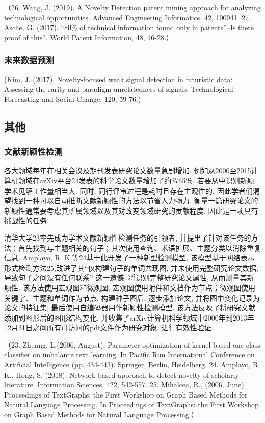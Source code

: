 \documentclass{Style/aas}
\begin{document}
\begin{multicols}{2}
  （26.	Wang, J. (2019). A Novelty Detection patent mining approach for analyzing technological opportunities. Advanced Engineering Informatics, 42, 100941.
  27.	Asche, G. (2017). “80\% of technical information found only in patents”–Is there proof of this?. World Patent Information, 48, 16-28.）
  
  \subsubsection{未来数据预测}
  (Kim, J. (2017). Novelty-focused weak signal detection in futuristic data: Assessing the rarity and paradigm unrelatedness of signals. Technological Forecasting and Social Change, 120, 59-76.)

  \subsection{其他}
  \subsubsection{文献新颖性检测}
  各大领域每年在相关会议及期刊发表研究论文数量急剧增加, 例如从2000至2015计算机领域在arXiv平台24发表的科学论文数量增加了约3765％, 若要从中识别新颖学术见解工作量相当大. 同时, 同行评审过程是耗时且存在主观性的, 因此学者们渴望找到一种可以自动推断文献新颖性的方法以节省人力物力. 衡量一篇研究论文的新颖性通常要考虑其所属领域以及其对改变领域研究的贡献程度, 因此是一项具有挑战性的任务. 

  清华大学23率先成为学术文献新颖性检测任务的引领者, 并提出了针对该任务的方法：首先找到与主题相关的句子；其次使用查询、术语扩展、主题分类以消除重复信息. Amplayo, R. K.等24基于此开发了一种新型检测模型, 该模型基于网络表示形式检测方法25,改进了其“仅构建句子的单词共现图, 并未使用完整研究论文数据, 导致句子之间没有任何联系” 这一遗憾, 将识别完整研究论文属性, 从而测量其新颖性. 该方法使用宏观图和微观图, 宏观图使用附件和文档作为节点；微观图使用关键字、主题和单词作为节点. 构建种子图后, 逐步添加论文, 并将图中变化记录为论文的特征集, 最后使用自编码器用作新颖性检测模型. 该方法反映了将研究文献添加到图形后的图形结构变化, 并收集了arXiv计算机科学领域中2000年到2013年12月31日之间所有可访问的pdf文件作为研究对象, 进行有效性验证. 

  （23.	Zhuang, L.(2006, August). Parameter optimization of kernel-based one-class classifier on imbalance text learning. In Pacific Rim International Conference on Artificial Intelligence (pp. 434-443). Springer, Berlin, Heidelberg.
  24.	Amplayo, R. K., Hong, S. (2018). Network-based approach to detect novelty of scholarly literature. Information Sciences, 422, 542-557.
  25.	Mihalcea, R.,  (2006, June). Proceedings of TextGraphs: the First Workshop on Graph Based Methods for Natural Language Processing. In Proceedings of TextGraphs: the First Workshop on Graph Based Methods for Natural Language Processing.）
  

\end{multicols}
\end{document}
